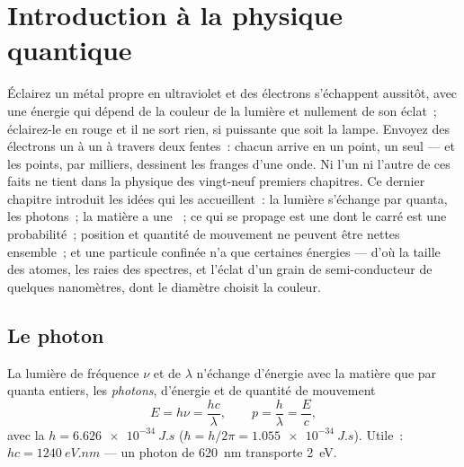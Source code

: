 \chapter{Introduction à la physique quantique}\label{ch:b1:quantum-introduction}

Éclairez un métal propre en ultraviolet et des électrons s'échappent
aussitôt, avec une énergie qui dépend de la couleur de la lumière et
nullement de son éclat~; éclairez-le en rouge et il ne sort rien, si
puissante que soit la lampe. Envoyez des électrons un à un à travers
deux fentes~: chacun arrive en un point, un seul --- et les points, par
milliers, dessinent les franges d'une onde. Ni l'un ni l'autre de ces
faits ne tient dans la physique des vingt-neuf premiers chapitres. Ce
dernier chapitre introduit les idées qui les accueillent~: la lumière
s'échange par quanta, les photons~; la matière a une ~;
ce qui se propage est une  dont le carré est une probabilité~;
position et quantité de mouvement ne peuvent être nettes ensemble~; et
une particule confinée n'a que certaines énergies --- d'où la taille des
atomes, les raies des spectres, et l'éclat d'un grain de
semi-conducteur de quelques nanomètres, dont le diamètre choisit la couleur.

\section{Le photon}

\begin{theorem}\label{thm:b1:quantum-introduction:photon}
La lumière de fréquence $\nu$ et de  $\lambda$ n'échange
d'énergie avec la matière que par quanta entiers, les \emph{photons},
d'énergie et de quantité de mouvement
\[
E = h\nu = \frac{hc}{\lambda} , \qquad p = \frac{h}{\lambda} = \frac{E}{c} ,
\]
avec la \emph{} $h = \qty{6.626e-34}{J.s}$ ($\hbar = h/2\pi =
\qty{1.055e-34}{J.s}$). Utile~: $hc = \qty{1240}{eV.nm}$ --- un photon de
\qty{620}{nm} transporte \qty{2}{eV}.
\end{theorem}
\admitted

